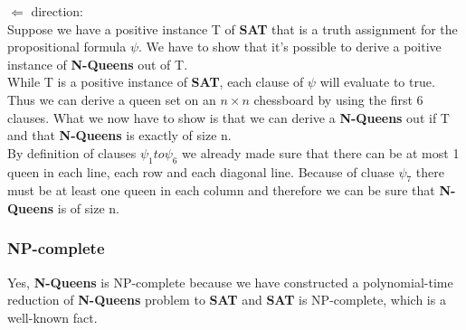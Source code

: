 $\Leftarrow$ direction:\\
Suppose we have a positive instance T of \textbf{SAT} that is a truth assignment for the propositional
formula $\psi$. We have to show that it's possible to derive a poitive instance of 
\textbf{N-Queens} out of T.\\
While T is a positive instance of \textbf{SAT}, each clause of $\psi$ will evaluate 
to true. Thus we can derive a queen set on an $n \times n$ chessboard by using the 
first 6 clauses. What we now have to show is that we can derive a \textbf{N-Queens}
out if T and that \textbf{N-Queens} is exactly of size n.\\
By definition of clauses $\psi_1 to \psi_6$ we already made sure that there can be at
most 1 queen in each line, each row and each diagonal line. Because of cluase 
$\psi_7$ there must be at least one queen in each column and therefore we can be sure
that \textbf{N-Queens} is of size n.

\subsubsection{NP-complete}
Yes, \textbf{N-Queens} is NP-complete because we have constructed a polynomial-time 
reduction of \textbf{N-Queens} problem to \textbf{SAT} and \textbf{SAT} is NP-complete, 
which is a well-known fact.
